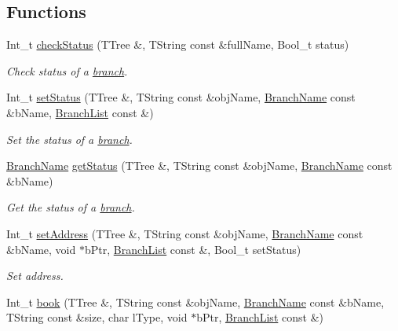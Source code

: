 \subsection*{Functions}
\begin{DoxyCompactItemize}
\item 
Int\_\-t \hyperlink{namespacepanda_1_1utils_aafa411773a4b0ee829d99e6e5a0abdcd}{checkStatus} (TTree \&, TString const \&fullName, Bool\_\-t status)
\begin{DoxyCompactList}\small\item\em Check status of a \hyperlink{namespacepanda_1_1branch}{branch}. \item\end{DoxyCompactList}\item 
Int\_\-t \hyperlink{namespacepanda_1_1utils_a01665f786d6a2acedb8f008f3fc9fc84}{setStatus} (TTree \&, TString const \&objName, \hyperlink{classpanda_1_1utils_1_1BranchName}{BranchName} const \&bName, \hyperlink{classpanda_1_1utils_1_1BranchList}{BranchList} const \&)
\begin{DoxyCompactList}\small\item\em Set the status of a \hyperlink{namespacepanda_1_1branch}{branch}. \item\end{DoxyCompactList}\item 
\hyperlink{classpanda_1_1utils_1_1BranchName}{BranchName} \hyperlink{namespacepanda_1_1utils_a8928c2bd486eae6103c33618c6eb4e80}{getStatus} (TTree \&, TString const \&objName, \hyperlink{classpanda_1_1utils_1_1BranchName}{BranchName} const \&bName)
\begin{DoxyCompactList}\small\item\em Get the status of a \hyperlink{namespacepanda_1_1branch}{branch}. \item\end{DoxyCompactList}\item 
Int\_\-t \hyperlink{namespacepanda_1_1utils_abf9c62e588560197c2bae9932e6a6e05}{setAddress} (TTree \&, TString const \&objName, \hyperlink{classpanda_1_1utils_1_1BranchName}{BranchName} const \&bName, void $\ast$bPtr, \hyperlink{classpanda_1_1utils_1_1BranchList}{BranchList} const \&, Bool\_\-t setStatus)
\begin{DoxyCompactList}\small\item\em Set address. \item\end{DoxyCompactList}\item 
Int\_\-t \hyperlink{namespacepanda_1_1utils_aaa6c7cd5892388e6ffdf713b11abf793}{book} (TTree \&, TString const \&objName, \hyperlink{classpanda_1_1utils_1_1BranchName}{BranchName} const \&bName, TString const \&size, char lType, void $\ast$bPtr, \hyperlink{classpanda_1_1utils_1_1BranchList}{BranchList} const \&)

\end{DoxyCompactItemize}
